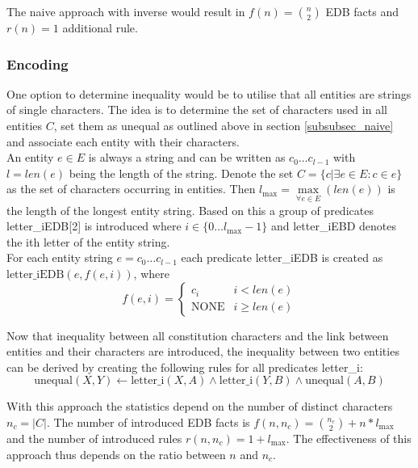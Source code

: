 \documentclass[hyperref,bachelorofscience,fleqn]{cgvpub}
\begin{document}
The naive approach with inverse would result in \(f(n) = \binom{n}{2}\) EDB facts and \(r(n) = 1\) additional rule.

\subsubsection{Encoding}\label{subsubsec_encoding}
One option to determine inequality would be to utilise that all entities are strings of single characters. The idea is to determine the set of characters used in all entities \(C\), set them as unequal as outlined above in section \ref{subsubsec_naive} and associate each entity with their characters.\\

An entity \(e \in E\) is always a string and can be written as \(c_0 \ldots c_{l - 1}\) with \(l = len(e)\) being the length of the string. Denote the set \(C = \{c | \exists e \in E: c \in e\}\) as the set of characters occurring in entities. Then \(l_{\max} = \max\limits_{\forall e \in E}(len(e))\) is the length of the longest entity string. Based on this a group of predicates letter\_iEDB[2] is introduced where \(i \in \{0 \ldots l_{\max}-1\}\) and letter\_iEBD denotes the ith letter of the entity string.\\

For each entity string \(e = c_0 \ldots c_{l - 1}\) each predicate letter\_iEDB is created as \(\text{letter\_iEDB}(e, f(e, i))\), where
\begin{equation*}
f(e, i) = 
\begin{cases}
      c_i & i < len(e) \\
      \text{NONE} & i \geq len(e)
\end{cases}
\end{equation*}

Now that inequality between all constitution characters and the link between entities and their characters are introduced, the inequality between two entities can be derived by creating the following rules for all predicates letter\_i:
\begin{equation*}
\text{unequal}(X, Y) \leftarrow \text{letter\_i}(X, A) \wedge \text{letter\_i}(Y, B) \wedge \text{unequal}(A, B)
\end{equation*}

With this approach the statistics depend on the number of distinct characters \(n_c = |C|\). The number of introduced EDB facts is \(f(n, n_c) = \binom{n_c}{2} + n*l_{\max}\) and the number of introduced rules \(r(n, n_c) = 1 + l_{\max}\). The effectiveness of this approach thus depends on the ratio between \(n\) and \(n_c\).
\end{document}
